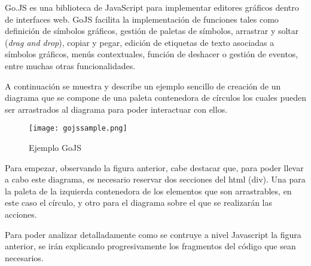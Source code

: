 	 		
Go.JS \cite{gojs} es una biblioteca de JavaScript para implementar editores gráficos dentro de interfaces web. GoJS facilita la implementación de funciones tales como definición de símbolos gráficos, gestión de paletas de símbolos, arrastrar y soltar (\emph{drag and drop}), copiar y pegar, edición de etiquetas de texto asociadas a símbolos gráficos, menús contextuales, función de deshacer o gestión de eventos, entre muchas otras funcionalidades.

\vspace{5mm}
	 		

A continuación se muestra y describe un ejemplo sencillo de creación de un diagrama que se compone de una paleta contenedora de círculos los cuales pueden ser arrastrados al diagrama para poder interactuar con ellos.

\vspace{5mm}

\begin{figure}[H]
	\centering
	\texttt{[image: gojssample.png]}
	\caption{Ejemplo GoJS}\label{fig:gojssample}
\end{figure}

\vspace{5mm}

Para empezar, observando la figura anterior, cabe destacar que, para poder llevar a cabo este diagrama, es necesario reservar dos secciones del html (div). Una para la paleta de la izquierda contenedora de los elementos que son arrastrables, en este caso el círculo, y otro para el diagrama sobre el que se realizarán las acciones.


\vspace{5mm}

Para poder analizar detalladamente como se contruye a nivel Javascript la figura anterior, se irán explicando progresivamente los fragmentos del código que sean necesarios.

